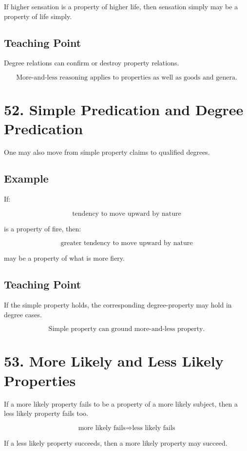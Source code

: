 \documentclass[12pt]{article}
\begin{document}
If higher sensation is a property of higher life, then sensation simply may be a
property of life simply.

\subsection*{Teaching Point}

Degree relations can confirm or destroy property relations.

\[
\boxed{
\text{More-and-less reasoning applies to properties as well as goods and genera.}
}
\]

\section*{52. Simple Predication and Degree Predication}

One may also move from simple property claims to qualified degrees.

\subsection*{Example}

If:

\[
\text{tendency to move upward by nature}
\]

is a property of fire, then:

\[
\text{greater tendency to move upward by nature}
\]

may be a property of what is more fiery.

\subsection*{Teaching Point}

If the simple property holds, the corresponding degree-property may hold in
degree cases.

\[
\boxed{
\text{Simple property can ground more-and-less property.}
}
\]

\section*{53. More Likely and Less Likely Properties}

If a more likely property fails to be a property of a more likely subject, then
a less likely property fails too.

\[
\text{more likely fails} \Rightarrow \text{less likely fails}
\]

If a less likely property succeeds, then a more likely property may succeed.
\end{document}
